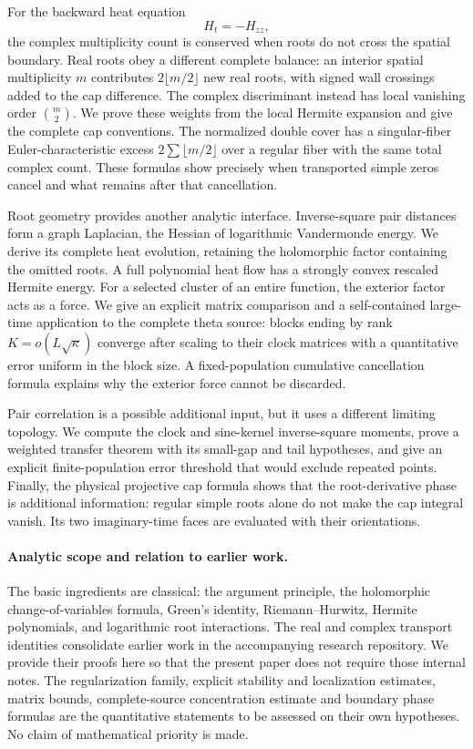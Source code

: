 For the backward heat equation
\begin{equation}\label{intro:heat}
 H_t=-H_{zz},
\end{equation}
the complex multiplicity count is conserved when roots do not cross the
spatial boundary. Real roots obey a different complete balance: an
interior spatial multiplicity $m$ contributes $2\lfloor m/2\rfloor$
new real roots, with signed wall crossings added to the cap difference.
The complex discriminant instead has local vanishing order
$\binom m2$. We prove these weights from the local Hermite expansion and
give the complete cap conventions. The normalized double cover has a
singular-fiber Euler-characteristic excess
$2\sum\lfloor m/2\rfloor$ over a regular fiber with the same total
complex count. These formulas show precisely when transported simple
zeros cancel and what remains after that cancellation.

Root geometry provides another analytic interface. Inverse-square pair
distances form a graph Laplacian, the Hessian of logarithmic Vandermonde
energy. We derive its complete heat evolution, retaining the holomorphic
factor containing the omitted roots. A full polynomial heat flow has a
strongly convex rescaled Hermite energy. For a selected cluster of an
entire function, the exterior factor acts as a force. We give an explicit
matrix comparison and a self-contained large-time application to the
complete theta source: blocks ending by rank $K=o(L\sqrt\kappa)$
converge after scaling to their clock matrices with a quantitative error
uniform in the block size. A fixed-population cumulative cancellation
formula explains why the exterior force cannot be discarded.

Pair correlation is a possible additional input, but it uses a different
limiting topology. We compute the clock and sine-kernel inverse-square
moments, prove a weighted transfer theorem with its small-gap and tail
hypotheses, and give an explicit finite-population error threshold that
would exclude repeated points. Finally, the physical projective cap
formula shows that the root-derivative phase is additional information:
regular simple roots alone do not make the cap integral vanish. Its two
imaginary-time faces are evaluated with their orientations.

\paragraph{Analytic scope and relation to earlier work.}
The basic ingredients are classical: the argument principle, the
holomorphic change-of-variables formula, Green's identity,
Riemann--Hurwitz, Hermite polynomials, and logarithmic root interactions.
The real and complex transport identities consolidate earlier work in
the accompanying research repository. We provide their proofs here so
that the present paper does not require those internal notes. The
regularization family, explicit stability and localization estimates,
matrix bounds, complete-source concentration estimate and boundary
phase formulas are the quantitative statements to be assessed on their
own hypotheses. No claim of mathematical priority is made.

